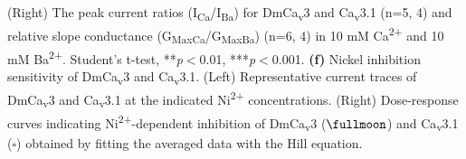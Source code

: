 (Right) The peak current ratios (I\textsubscript{Ca}/I\textsubscript{Ba}) for DmCa\textsubscript{v}3 and Ca\textsubscript{v}3.1 (n=5, 4) and relative slope conductance (G\textsubscript{MaxCa}/G\textsubscript{MaxBa}) (n=6, 4) in 10 mM Ca\textsuperscript{2+} and 10 mM Ba\textsuperscript{2+}.
Student's t-test, **\emph{p}$<$0.01, ***\emph{p}$<$0.001.
{\bf(f)} Nickel inhibition sensitivity of DmCa\textsubscript{v}3 and Ca\textsubscript{v}3.1. 
(Left) Representative current traces of DmCa\textsubscript{v}3 and Ca\textsubscript{v}3.1 at the indicated Ni\textsuperscript{2+} concentrations. 
(Right) Dose-response curves indicating Ni\textsuperscript{2+}-dependent inhibition of DmCa\textsubscript{v}3 ($\fullmoon$) and Ca\textsubscript{v}3.1 ($\square$) obtained by fitting the averaged data with the Hill equation.

